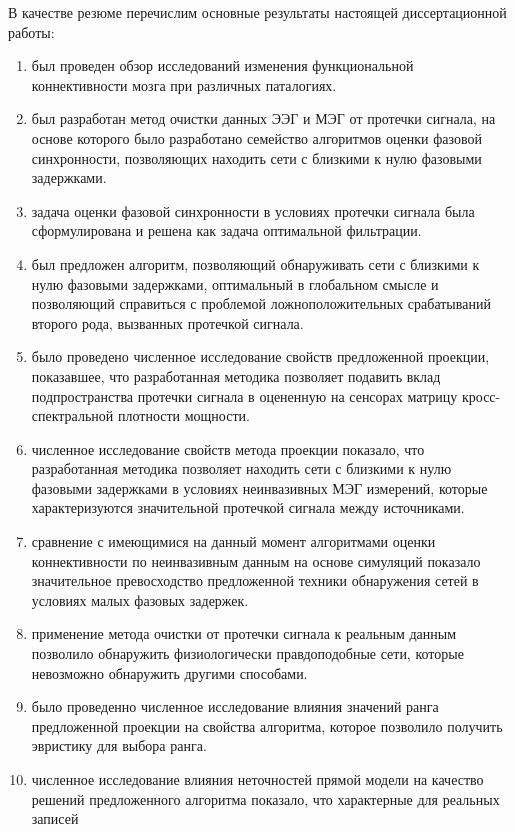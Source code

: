 В качестве резюме перечислим основные результаты настоящей диссертационной работы:
\fi

\begin{enumerate}
  \item был проведен обзор исследований изменения функциональной коннективности
      мозга при различных паталогиях.
  \item был разработан метод очистки данных ЭЭГ и МЭГ от протечки сигнала, на
      основе которого было разработано семейство алгоритмов оценки фазовой синхронности,
      позволяющих находить сети с близкими к нулю фазовыми задержками.
  \item задача оценки фазовой синхронности в условиях протечки сигнала была
      сформулирована и решена как задача оптимальной фильтрации.
  \item был предложен алгоритм, позволяющий обнаруживать сети с близкими
      к нулю фазовыми задержками, оптимальный в глобальном смысле и позволяющий
      справиться с проблемой ложноположительных срабатываний второго рода, вызванных
      протечкой сигнала.
  \item было проведено численное исследование свойств предложенной
      проекции, показавшее, что разработанная методика позволяет
      подавить вклад подпространства протечки сигнала в оцененную
      на сенсорах матрицу кросс-спектральной плотности мощности.
  \item численное исследование свойств метода проекции показало, что
      разработанная методика позволяет находить сети с близкими к нулю фазовыми задержками в условиях
      неинвазивных МЭГ измерений, которые характеризуются значительной протечкой
      сигнала между источниками.
  \item сравнение с имеющимися на данный момент алгоритмами оценки коннективности
      по неинвазивным данным на основе симуляций показало значительное превосходство
      предложенной техники обнаружения сетей в условиях малых фазовых задержек.
  \item применение метода очистки от протечки сигнала к реальным данным позволило
      обнаружить физиологически правдоподобные сети, которые невозможно обнаружить
      другими способами.
  \item было проведенно численное исследование влияния значений ранга предложенной проекции
      на свойства алгоритма, которое позволило получить эвристику для выбора ранга.
  \item численное исследование влияния неточностей прямой модели на качество решений
      предложенного алгоритма показало, что характерные для реальных записей

\end{enumerate}
